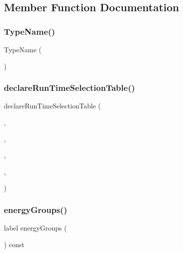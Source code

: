 \subsection{Member Function Documentation}
\mbox{\label{classFoam_1_1XS_a505c0bff76aae4fd2564ecdc6d31e501}} 
\subsubsection{\texorpdfstring{Type\+Name()}{TypeName()}}
{\footnotesize\ttfamily Type\+Name (\begin{DoxyParamCaption}\item[{\char`\"{}XS\char`\"{}}]{ }\end{DoxyParamCaption})}

\mbox{\label{classFoam_1_1XS_a83cc058a37d82e00893b94e84e7ddc75}} 
\subsubsection{\texorpdfstring{declare\+Run\+Time\+Selection\+Table()}{declareRunTimeSelectionTable()}}
{\footnotesize\ttfamily declare\+Run\+Time\+Selection\+Table (\begin{DoxyParamCaption}\item[{auto\+Ptr}]{,  }\item[{\hyperlink{classFoam_1_1XS}{XS}}]{,  }\item[{dictionary}]{,  }\item[{(const fv\+Mesh \&\hyperlink{createMeshesPostProcess_8H_a8bb1e58291d2d2b653e024a4f4bffe38}{mesh})}]{,  }\item[{(\hyperlink{createMeshesPostProcess_8H_a8bb1e58291d2d2b653e024a4f4bffe38}{mesh})}]{ }\end{DoxyParamCaption})}

\mbox{\label{classFoam_1_1XS_a4ac79b302698620f0566eac803ba02d3}} 
\subsubsection{\texorpdfstring{energy\+Groups()}{energyGroups()}}
{\footnotesize\ttfamily label energy\+Groups (\begin{DoxyParamCaption}{ }\end{DoxyParamCaption}) const\hspace{0.3cm}{\ttfamily [inline]}}



